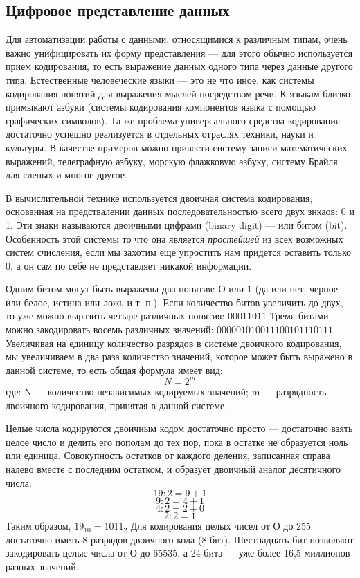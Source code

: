 \documentclass[a4paper]{article}
\begin{document}
\subsection{Цифровое представление данных}

Для автоматизации работы с данными, относящимися к различным типам, очень важно унифицировать их форму представления — для этого обычно используется прием кодирования, то есть выражение данных одного типа через данные другого типа. Естественные человеческие языки --- это не что иное, как системы кодирования понятий для выражения мыслей посредством речи. К языкам близко примыкают азбуки (системы кодирования компонентов языка с помощью графических символов). Та же проблема универсального средства кодирования достаточно успешно реализуется в отдельных отраслях техники, науки и культуры. В качестве примеров можно привести систему записи математических выражений, телеграфную азбуку, морскую флажковую азбуку, систему Брайля для слепых и многое другое.

В вычислительной технике используется двоичная система кодирования, основанная на предствалении данных последовательностью всего двух знкаов: 0 и 1. Эти знаки называются двоичными цифрами (binary digit) --- или битом (bit). Особенность этой системы то что она является \textit{простейшей} из всех возможных систем счисления, если мы захотим еще упростить нам придется оставить только 0, а он сам по себе не представляет никакой информации.

Одним битом могут быть выражены два понятия: О или 1 (да или нет, черное или белое, истина или ложь и т. п.). Если количество битов увеличить до двух, то уже можно выразить четыре различных понятия:
$00 01 10 11$
Тремя битами можно закодировать восемь различных значений:
$000 001 010 011 100 101 110 111$
Увеличивая на единицу количество разрядов в системе двоичного кодирования, мы увеличиваем в два раза количество значений, которое может быть выражено в данной системе, то есть общая формула имеет вид:
$$N=2^{m}$$
где:
N --- количество независимых кодируемых значений;
m --- разрядность двоичного кодирования, принятая в данной системе.

Целые числа кодируются двоичным кодом достаточно просто — достаточно взять целое число и делить его пополам до тех пор, пока в остатке не образуется ноль или единица. Совокупность остатков от каждого деления, записанная справа налево вместе с последним остатком, и образует двоичный аналог десятичного числа.
$$19:2 = 9+1$$
$$9 : 2 = 4 + 1$$
$$4 : 2 = 2 + 0$$
$$2:2 = 1$$
Таким образом, $19_{10} = 1011_{2}$
Для кодирования целых чисел от О до 255 достаточно иметь 8 разрядов двоичного кода (8 бит). Шестнадцать бит позволяют закодировать целые числа от О до 65535, а 24 бита — уже более 16,5 миллионов разных значений.
\end{document}
